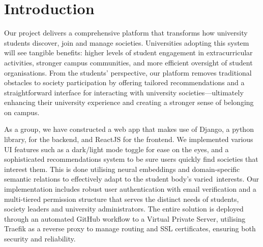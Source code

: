 \chapter{Introduction}

\noindent Our project delivers a comprehensive platform that transforms how university students discover, join and manage societies. Universities adopting this system will see tangible benefits: higher levels of student engagement in extracurricular activities, stronger campus communities, and more efficient oversight of student organisations. From the students' perspective, our platform removes traditional obstacles to society participation by offering tailored recommendations and a straightforward interface for interacting with university societies—ultimately enhancing their university experience and creating a stronger sense of belonging on campus.

\noindent As a group, we have constructed a web app that makes use of Django, a python library, for the backend, and ReactJS for the frontend. We implemented various UI features such as a dark/light mode toggle for ease on the eyes, and a sophisticated recommendations system to be sure users quickly find societies that interest them. This is done utilising neural embeddings and domain-specific semantic relations to effectively adapt to the student body's varied interests. Our implementation includes robust user authentication with email verification and a multi-tiered permission structure that serves the distinct needs of students, society leaders and university administrators. The entire solution is deployed through an automated GitHub workflow to a Virtual Private Server, utilising Traefik as a reverse proxy to manage routing and SSL certificates, ensuring both security and reliability.